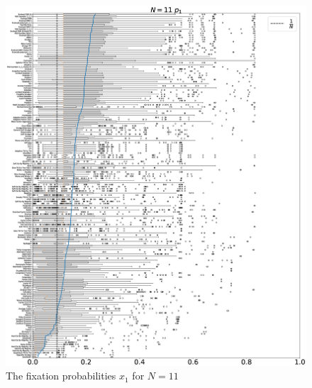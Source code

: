 \documentclass[10pt,letterpaper]{article}
\begin{document}
\begin{figure}[!hbtp]
    \centering
    \includegraphics[draft, width=\textwidth]{./Fig21.eps}
    \caption{The fixation probabilities \(x_1\) for \(N=11\)}
\end{figure}
\end{document}
